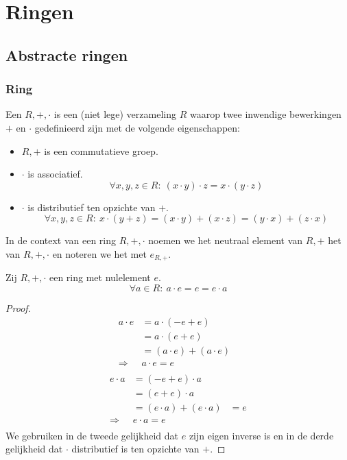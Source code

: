 \documentclass[main.tex]{subfiles}
\begin{document}
\chapter{Ringen}
\label{cha:ringen}

\section{Abstracte ringen}
\label{sec:abstracte-ringen}

\subsection{Ring}
\label{sec:ring}
\begin{de}
  Een  $R,+,\cdot$ is een (niet lege) verzameling $R$ waarop twee inwendige bewerkingen $+$ en $\cdot$ gedefinieerd zijn met de volgende eigenschappen:
  \begin{itemize}
  \item $R,+$ is een commutatieve groep.
  \item $\cdot$ is associatief.
    \[ \forall x,y,z \in R:\ (x\cdot y) \cdot z = x \cdot (y \cdot z) \]
  \item $\cdot$ is distributief ten opzichte van $+$.
    \[ \forall x,y,z \in R:\ x\cdot (y + z) = (x \cdot y) + (x \cdot z) = (y \cdot x) + (z \cdot x) \]
  \end{itemize}
\end{de}

\begin{de}
  In de context van een ring $R,+,\cdot$ noemen we het neutraal element van $R,+$ het  van $R,+,\cdot$ en noteren we het met $e_{R,+}$.
\end{de}

\begin{ei}
  \label{ei:nulelement-opslorpend}
  Zij $R,+,\cdot$ een ring met nulelement $e$.
  \[ \forall a \in R:\ a \cdot e = e = e \cdot a \]

  \begin{proof}
    \[
    \begin{array}{rll}
      a \cdot e &= a \cdot (-e+e) &\\
                &= a \cdot (e+e) &\\
                &= (a \cdot e) + (a \cdot e)\\
      \Rightarrow & a \cdot e = e\\
    \end{array}
    \]
    \[
    \begin{array}{rll}
      e \cdot a &= (-e+e) \cdot a &\\
                &= (e+e) \cdot a &\\
                &= (e \cdot a) + (e \cdot a) &= e\\
      \Rightarrow & e \cdot a = e\\
    \end{array}
    \]
    We gebruiken in de tweede gelijkheid dat $e$ zijn eigen inverse is en in de derde gelijkheid dat $\cdot$ distributief is ten opzichte van $+$.
  \end{proof}
\end{ei}
\end{document}
